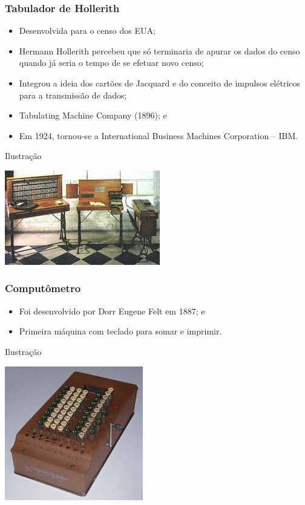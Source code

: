 \documentclass[aspectratio=169]{beamer} %
\begin{document}
\begin{frame}
	\frametitle{Tabulador de Hollerith}
	
	\begin{itemize}
		\item Desenvolvida para o censo dos EUA;
		\item  Hermann Hollerith percebeu que só terminaria de apurar os dados do censo quando já seria o tempo de se efetuar novo censo;
		\item Integrou a ideia dos cartões de Jacquard e do conceito de impulsos elétricos para a transmissão de dados;
		\item Tabulating Machine Company (1896); e
		\item Em 1924, tornou-se a International Business Machines Corporation – IBM.
	\end{itemize}\vfill
	
	\begin{exampleblock}{Ilustra\c cão}
		\begin{center}
			\includegraphics[scale=0.5]{img/tabulador_hollerith}
		\end{center}
	\end{exampleblock}
\end{frame}

\begin{frame}
	\frametitle{Computômetro}
	
	\begin{itemize}
		\item Foi desenvolvido por  Dorr Eugene Felt em 1887; e
		\item Primeira máquina com teclado para somar e imprimir.
	\end{itemize}\vfill
	
	\begin{exampleblock}{Ilustra\c cão}
		\begin{center}
			\includegraphics[scale=0.5]{img/computometro}
		\end{center}
	\end{exampleblock}
\end{frame}
\end{document}
